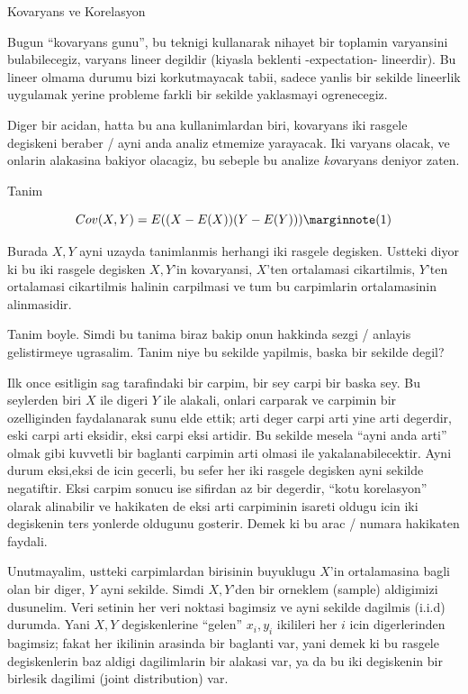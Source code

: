 \documentclass[12pt,fleqn]{article}\usepackage{../common}
\begin{document}
Kovaryans ve Korelasyon

Bugun ``kovaryans gunu'', bu teknigi kullanarak nihayet bir toplamin
varyansini bulabilecegiz, varyans lineer degildir (kiyasla beklenti
-expectation- lineerdir). Bu lineer olmama durumu bizi korkutmayacak tabii,
sadece yanlis bir sekilde lineerlik uygulamak yerine probleme farkli bir
sekilde yaklasmayi ogrenecegiz. 

Diger bir acidan, hatta bu ana kullanimlardan biri, kovaryans iki rasgele
degiskeni beraber / ayni anda analiz etmemize yarayacak. Iki varyans
olacak, ve onlarin alakasina bakiyor olacagiz, bu sebeple bu analize {\em
  ko}varyans deniyor zaten. 

Tanim

$$ Cov(X,Y) = E((X-E(X))(Y-E(Y))) \mlabel{1} $$

Burada $X,Y$ ayni uzayda tanimlanmis herhangi iki rasgele degisken. Ustteki
diyor ki bu iki rasgele degisken $X,Y$'in kovaryansi, $X$'ten ortalamasi
cikartilmis, $Y$'ten ortalamasi cikartilmis halinin carpilmasi ve tum bu
carpimlarin ortalamasinin alinmasidir.

Tanim boyle. Simdi bu tanima biraz bakip onun hakkinda sezgi / anlayis
gelistirmeye ugrasalim. Tanim niye bu sekilde yapilmis, baska bir sekilde
degil?

Ilk once esitligin sag tarafindaki bir carpim, bir sey carpi bir baska
sey. Bu seylerden biri $X$ ile digeri $Y$ ile alakali, onlari carparak ve
carpimin bir ozelliginden faydalanarak sunu elde ettik; arti deger carpi
arti yine arti degerdir, eski carpi arti eksidir, eksi carpi eksi
artidir. Bu sekilde mesela ``ayni anda arti'' olmak gibi kuvvetli bir
baglanti carpimin arti olmasi ile yakalanabilecektir. Ayni durum eksi,eksi
de icin gecerli, bu sefer her iki rasgele degisken ayni sekilde
negatiftir. Eksi carpim sonucu ise sifirdan az bir degerdir, ``kotu
korelasyon'' olarak alinabilir ve hakikaten de eksi arti carpiminin isareti
oldugu icin iki degiskenin ters yonlerde oldugunu gosterir. Demek ki bu
arac / numara hakikaten faydali. 

Unutmayalim, ustteki carpimlardan birisinin buyuklugu $X$'in ortalamasina
bagli olan bir diger, $Y$ ayni sekilde. Simdi $X,Y$'den bir orneklem
(sample) aldigimizi dusunelim. Veri setinin her veri noktasi bagimsiz ve
ayni sekilde dagilmis (i.i.d) durumda. Yani $X,Y$ degiskenlerine ``gelen''
$x_i,y_i$ ikilileri her $i$ icin digerlerinden bagimsiz; fakat her ikilinin
arasinda bir baglanti var, yani demek ki bu rasgele degiskenlerin baz
aldigi dagilimlarin bir alakasi var, ya da bu iki degiskenin bir birlesik
dagilimi (joint distribution) var.
\end{document}
